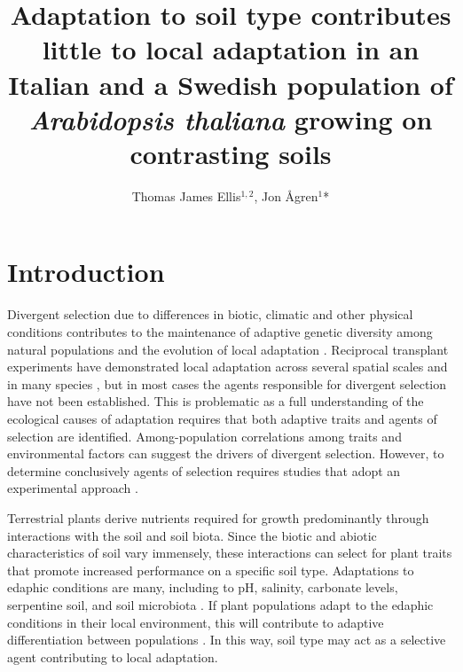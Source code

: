 \documentclass[twocolumn,twoside,lettersize]{article}
\title{Adaptation to soil type contributes little to local adaptation in an Italian and a Swedish population of \textit{Arabidopsis thaliana} growing on contrasting soils}
\author{
Thomas James Ellis$^{1,2}$,
Jon {\AA}gren$^{1}$*
}
\date{
 \begin{list}{}{%
      \setlength{\leftmargin}{0cm}%
      \setlength{\rightmargin}{\leftmargin}}%
  \item\normalsize\bf 
  Natural populations are subject to selection caused by a range of biotic and abiotic factors in their native habitats. Identifying these agents of selection and quantifying their effects is key to understanding how populations adapt to local conditions.
  We performed a fully factorial reciprocal transplant experiment using locally adapted accessions of \textit{Arabidopsis thaliana} at their native sites to distinguish the contributions of adaptation to soil type and climate. Overall adaptive differentiation was strong at both sites.
  However, we found only very small differences in the strength of selection on local and non-local soil, and adaptation to soil type at most constituted only a few percent of overall adaptive differentiation.
  These results indicate that adaptation to local climatic conditions rather than soil type is the primary driver of adaptive differentiation between these ecotypes..
  \end{list}
}
\begin{document}
\maketitle

\section*{Introduction}

Divergent selection due to differences in biotic, climatic and other physical conditions contributes to the maintenance of adaptive genetic diversity among natural populations and the evolution of local adaptation \cite{Williams1966-jj, Hereford2009-xb}. Reciprocal transplant experiments have demonstrated local adaptation across several spatial scales and in many species \cite{Hereford2009-xb}, but in most cases the agents responsible for divergent selection have not been established. This is problematic as a full understanding of the ecological causes of adaptation requires that both adaptive traits and agents of selection are identified. Among-population correlations among traits and environmental factors can suggest the drivers of divergent selection. However, to determine conclusively agents of selection requires studies that adopt an experimental approach \cite{Briscoe_Runquist2020-vm, Hargreaves2020-np, Wadgymar2022-vs}.

Terrestrial plants derive nutrients required for growth predominantly through interactions with the soil and soil biota. Since the biotic and abiotic characteristics of soil vary immensely, these interactions can select for plant traits that promote increased performance on a specific soil type. Adaptations to edaphic conditions are many, including to pH, salinity, carbonate levels, serpentine soil, and soil microbiota \cite{Antonovics1970-om, Waser1985-sz, Wright2006-zr, Macel2007-nx, Turner2010-pq, Smith2012-yg, Teres2019-nd, Thiergart2020-rh}. If plant populations adapt to the edaphic conditions in their local environment, this will contribute to adaptive differentiation between populations \cite{Kawecki2004-sl}. In this way, soil type may act as a selective agent contributing to local adaptation.
\end{document}
